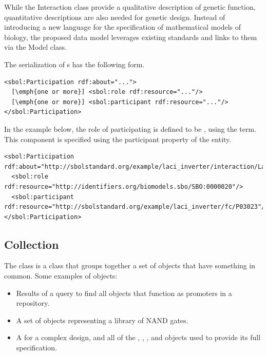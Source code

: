While the Interaction class provide a qualitative description of genetic function, quantitative descriptions are also needed for genetic design. Instead of introducing a new language for the specification of mathematical models of biology, the proposed data model leverages existing standards and links to them via the Model class. 

The serialization of s has the following form.
\begin{lstlisting}
<sbol:Participation rdf:about="...">
  [\emph{one or more}] <sbol:role rdf:resource="..."/>
  [\emph{one or more}] <sbol:participant rdf:resource="..."/>
</sbol:Participation>
\end{lstlisting}

In the example below, the role of participating  is defined to be , using the  term. This component is specified using the participant property of the  entity.
\begin{lstlisting}
<sbol:Participation rdf:about="http://sbolstandard.org/example/laci_inverter/interaction/LacI_pLacI/participation/P03023">
  <sbol:role rdf:resource="http://identifiers.org/biomodels.sbo/SBO:0000020"/>
  <sbol:participant rdf:resource="http://sbolstandard.org/example/laci_inverter/fc/P03023"/>
</sbol:Participation>
\end{lstlisting}

\subsection {Collection}
\label{sec:Collection}
The  class is a class that groups together a set of  objects that have something in common. 
Some examples of  objects:
\begin{itemize}
\item Results of a query to find all  objects that function as promoters in a repository.
\item A set of  objects representing a library of NAND gates.
\item A  for a complex design, and all of the , , , and  objects used to provide its full specification.
\end{itemize}

